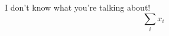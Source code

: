 \documentclass[12pt, a4paper]{article}
\begin{document}
I don't know what you're talking about!
$$
\sum_i x_i
$$
\end{document}
